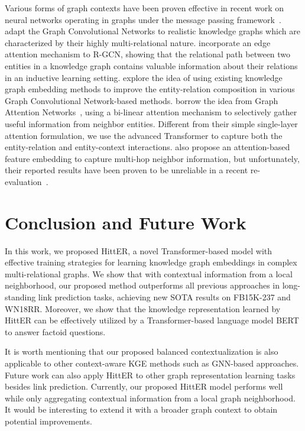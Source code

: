 \documentclass[11pt]{article}
\newcommand{\hit}{HittER\xspace}
\begin{document}
Various forms of graph contexts have been proven effective in recent work on neural networks operating in graphs under the message passing framework~\cite{bruna2013spectral,defferrard2016convolutional,kipf2016semi}.
\citet[R-GCN]{schlichtkrull2018rgcn} adapt the Graph Convolutional Networks to realistic knowledge graphs which are characterized by their highly multi-relational nature.
\citet{teru2019inductive} incorporate an edge attention mechanism to R-GCN, showing that the relational path between two entities in a knowledge graph contains valuable information about their relations in an inductive learning setting.
\citet{Vashishth2020Composition} explore the idea of using existing knowledge graph embedding methods to improve the entity-relation composition in various Graph Convolutional Network-based methods.
\citet{bansal-etal-2019-a2n} borrow the idea from Graph Attention Networks~\cite{velivckovic2018graph}, using a bi-linear attention mechanism to selectively gather useful information from neighbor entities. Different from their simple single-layer attention formulation, we use the advanced Transformer to capture both the entity-relation and entity-context interactions.
\citet{nathani-etal-2019-learning} also propose an attention-based feature embedding to capture multi-hop neighbor information, but unfortunately, their reported results have been proven to be unreliable in a recent re-evaluation~\cite{sun-etal-2020-evaluation}.
 \section{Conclusion and Future Work}
\label{sec:conclusion}
In this work, we proposed \hit, a novel Transformer-based model with effective training strategies for learning knowledge graph embeddings in complex multi-relational graphs. We show that with contextual information from a local neighborhood, our proposed method outperforms all previous approaches in long-standing link prediction tasks, achieving new SOTA results on FB15K-237 and WN18RR.
Moreover, we show that the knowledge representation learned by HittER can be effectively utilized by a Transformer-based language model BERT to answer factoid questions.

It is worth mentioning that our proposed balanced contextualization is also applicable to other context-aware KGE methods such as GNN-based approaches.
Future work can also apply \hit{} to other graph representation learning tasks besides link prediction.
Currently, our proposed \hit{} model performs well while only aggregating contextual information from a local graph neighborhood.
It would be interesting to extend it with a broader graph context to obtain potential improvements.
\end{document}

